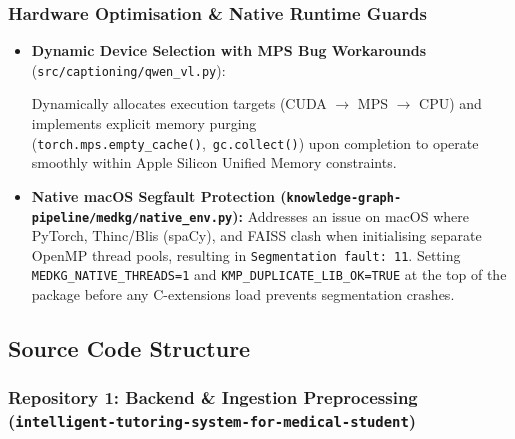 \subsubsection*{Hardware Optimisation \& Native Runtime Guards}

\begin{itemize}
    \item \textbf{Dynamic Device Selection with MPS Bug Workarounds}\\
          (\texttt{src/\allowbreak captioning/\allowbreak qwen\_vl.py}):
          {\sloppy Dynamically allocates execution targets (CUDA $\to$ MPS $\to$ CPU) and implements
          explicit memory purging (\texttt{torch.mps.\allowbreak empty\_cache()},\allowbreak\ \texttt{gc.\allowbreak collect()})
          upon completion to operate smoothly within Apple Silicon Unified Memory constraints.\par}

    \item \textbf{Native macOS Segfault Protection (\texttt{knowledge-graph-pipeline/\allowbreak medkg/\allowbreak native\_env.py}):}
          Addresses an issue on macOS where PyTorch, Thinc/Blis (spaCy), and FAISS clash when
          initialising separate OpenMP thread pools, resulting in \texttt{Segmentation fault: 11}.
          Setting \texttt{MEDKG\_NATIVE\_THREADS=1} and \texttt{KMP\_DUPLICATE\_LIB\_OK=TRUE}
          at the top of the package before any C-extensions load prevents segmentation crashes.
\end{itemize}

\subsection*{Source Code Structure}

\subsubsection*{Repository 1: Backend \& Ingestion Preprocessing\\{\normalsize\normalfont(\texttt{intelligent-tutoring-system-for-medical-student})}}

